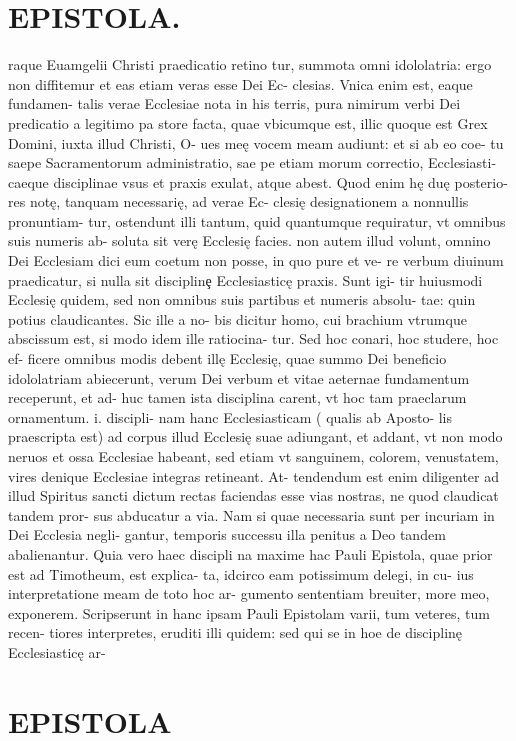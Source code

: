\documentclass{article}
\begin{document}
\begin{pages}
\section*{EPISTOLA. }raque Euamgelii Christi praedicatio retino tur, summota omni idololatria: ergo non diffitemur et eas etiam veras esse Dei Ec- clesias. Vnica enim est, eaque fundamen- talis verae Ecclesiae nota in his terris, pura nimirum verbi Dei predicatio a legitimo pa store facta, quae vbicumque est, illic quoque est Grex Domini, iuxta illud Christi, O- ues meę vocem meam audiunt: et si ab eo coe- tu saepe Sacramentorum administratio, sae pe etiam morum correctio, Ecclesiasti- caeque disciplinae vsus et praxis exulat, atque abest. Quod enim hę duę posterio- res notę, tanquam necessarię, ad verae Ec- clesię designationem a nonnullis pronuntiam- tur, ostendunt illi tantum, quid quantumque requiratur, vt omnibus suis numeris ab- soluta sit verę Ecclesię facies. non autem illud volunt, omnino Dei Ecclesiam dici eum coetum non posse, in quo pure et ve- re verbum diuinum praedicatur, si nulla sit disciplinȩ Ecclesiasticę praxis. Sunt igi- tir huiusmodi Ecclesię quidem, sed non omnibus suis partibus et numeris absolu- tae: quin potius claudicantes. Sic ille a no- bis dicitur homo, cui brachium vtrumque abscissum est, si modo idem ille ratiocina- tur. Sed hoc conari, hoc studere, hoc ef- ficere omnibus modis debent illę Ecclesię, quae summo Dei beneficio idololatriam abiecerunt, verum Dei verbum et vitae aeternae fundamentum receperunt, et ad- huc tamen ista disciplina carent, vt hoc tam praeclarum ornamentum. i. discipli- nam hanc Ecclesiasticam ( qualis ab Aposto- lis praescripta est) ad corpus illud Ecclesię suae adiungant, et addant, vt non modo neruos et ossa Ecclesiae habeant, sed etiam vt sanguinem, colorem, venustatem, vires denique Ecclesiae integras retineant. At- tendendum est enim diligenter ad illud Spiritus sancti dictum rectas faciendas esse vias nostras, ne quod claudicat tandem pror- sus abducatur a via. Nam si quae necessaria sunt per incuriam in Dei Ecclesia negli- gantur, temporis successu illa penitus a Deo tandem abalienantur. Quia vero haec discipli na maxime hac Pauli Epistola, quae prior est ad Timotheum, est explica- ta, idcirco eam potissimum delegi, in cu- ius interpretatione meam de toto hoc ar- gumento sententiam breuiter, more meo, exponerem. Scripserunt in hanc ipsam Pauli Epistolam varii, tum veteres, tum recen- tiores interpretes, eruditi illi quidem: sed qui se in hoe de disciplinę Ecclesiasticę ar- 
\section*{EPISTOLA }

\end{pages}
\end{document}
